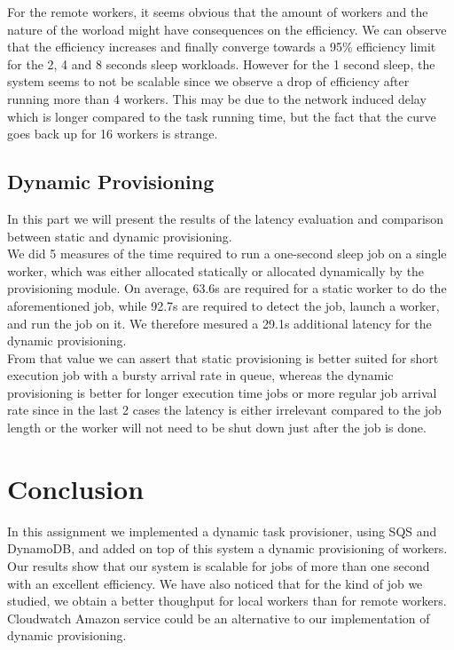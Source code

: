 \documentclass{article}
\begin{document}
For the remote workers, it seems obvious that the amount of workers and the nature of the worload might have consequences on the efficiency. We can observe that the efficiency increases and finally converge towards a 95\% efficiency limit for the 2, 4 and 8 seconds sleep workloads. However for the 1 second sleep, the system seems to not be scalable since we observe a drop of efficiency after running more than 4 workers. This may be due to the network induced delay which is longer compared to the task running time, but the fact that the curve goes back up for 16 workers is strange.

\subsection{Dynamic Provisioning}

In this part we will present the results of the latency evaluation and comparison between static and dynamic provisioning.\\
We did 5 measures of the time required to run a one-second sleep job on a single worker, which was either allocated statically or allocated dynamically by the provisioning module. On average, 63.6s are required for a static worker to do the aforementioned job, while 92.7s are required to detect the job, launch a worker, and run the job on it. We therefore mesured a 29.1s additional latency for the dynamic provisioning.\\
From that value we can assert that static provisioning is better suited for short execution job with a bursty arrival rate in queue, whereas the dynamic provisioning is better for longer execution time jobs or more regular job arrival rate since in the last 2 cases the latency is either irrelevant compared to the job length or the worker will not need to be shut down just after the job is done.

\section{Conclusion}
In this assignment we implemented a dynamic task provisioner, using SQS and DynamoDB, and added on top of this system a dynamic provisioning of workers. Our results show that our system is scalable for jobs of more than one second with an excellent efficiency. We have also noticed that for the kind of job we studied, we obtain a better thoughput for local workers than for remote workers. \\
Cloudwatch Amazon service could be an alternative to our implementation of dynamic provisioning.
\end{document}

